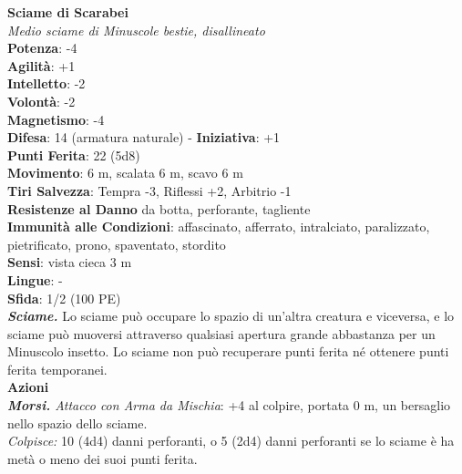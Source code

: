 \begin{multicols}{2}
\medskip\textbf{Sciame di Scarabei}\\
\emph{Medio sciame di Minuscole bestie, disallineato}\\
\textbf{Potenza}: -4\\
\textbf{Agilità}: +1\\
\textbf{Intelletto}: -2\\
\textbf{Volontà}: -2\\
\textbf{Magnetismo}: -4\\
\textbf{Difesa}: 14 (armatura naturale) - \textbf{Iniziativa}: +1\\
\textbf{Punti Ferita}: 22 (5d8)\\
\textbf{Movimento}: 6 m, scalata 6 m, scavo 6 m\\
\textbf{Tiri Salvezza}: Tempra -3, Riflessi +2, Arbitrio -1\\
\textbf{Resistenze al Danno} da botta, perforante, tagliente\\
\textbf{Immunità alle Condizioni}: affascinato, afferrato, intralciato, paralizzato, pietrificato, prono, spaventato, stordito\\
\textbf{Sensi}: vista cieca 3 m\\
\textbf{Lingue}: -\\
\textbf{Sfida}: 1/2 (100 PE)\smallskip\\
\emph{\textbf{Sciame.}} Lo sciame può occupare lo spazio di un'altra creatura e viceversa, e lo sciame può muoversi attraverso qualsiasi apertura grande abbastanza per un Minuscolo insetto. Lo sciame non può recuperare punti ferita né ottenere punti ferita temporanei.\\
\smallskip\textbf{Azioni}\\
\emph{\textbf{Morsi.} Attacco con Arma da Mischia}: +4 al colpire, portata 0 m, un bersaglio nello spazio dello sciame.\\
\emph{Colpisce:} 10 (4d4) danni perforanti, o 5 (2d4) danni perforanti se lo sciame è ha metà o meno dei suoi punti ferita.\\


\end{multicols}
